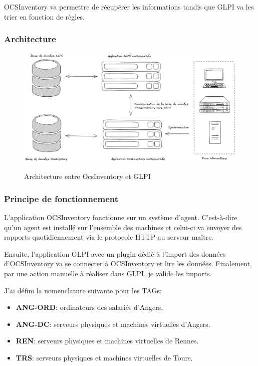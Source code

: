 \documentclass[12pt]{article}
\begin{document}
OCSInventory va permettre de récupérer les informations tandis que GLPI va les trier en fonction de règles.

\subsubsection{Architecture}
\begin{figure}[!ht]
    \centering
    \includegraphics[width=\textwidth]{src/Fonctionne GLPI.png}
    \label{fig:glpi}
    \caption{Architecture entre OcsInventory et GLPI}
\end{figure}

\newpage
\subsubsection{Principe de fonctionnement}
L'application OCSInventory fonctionne sur un système d'agent.
C'est-à-dire qu'un agent est installé sur l'ensemble des machines et celui-ci va envoyer des rapports quotidiennement via le protocole HTTP au serveur maître. 

Ensuite, l'application GLPI avec un plugin dédié à l'import des données d'OCSInventory va se connecter à OCSInventory et lire les données.
Finalement, par une action manuelle à réaliser dans GLPI, je valide les imports.

J'ai défini la nomenclature suivante pour les TAGs:
\begin{itemize}
    \item \textbf{ANG-ORD}: ordinateurs des salariés d'Angers.
    \item \textbf{ANG-DC}: serveurs physiques et machines virtuelles d'Angers.
    \item \textbf{REN}: serveurs physiques et machines virtuelles de Rennes.
    \item \textbf{TRS}: serveurs physiques et machines virtuelles de Tours.
\end{itemize}
\end{document}
